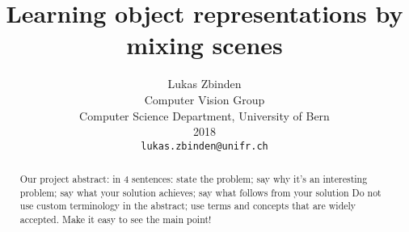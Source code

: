 \documentclass[11pt,a4paper]{article}
\begin{document}
\title{Learning object representations by mixing scenes}

\author{Lukas Zbinden\\
Computer Vision Group\\
Computer Science Department, University of Bern\\ 
2018\\
{\tt\small lukas.zbinden@unifr.ch}
}

\maketitle

\begin{abstract}
   Our project 
   abstract: in 4 sentences: state the problem; say why it's an interesting problem; say what your solution achieves; say what follows from your solution
   Do not use custom terminology in the abstract;
use terms and concepts that are widely accepted. Make it easy to see the main point!
\end{abstract}

\end{document}
